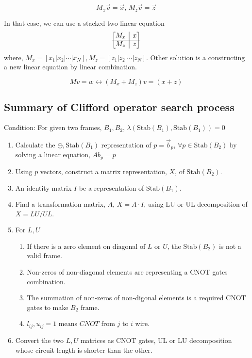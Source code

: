 \documentclass[a4paper,12pt]{article}
\newcommand{\rvline}{\hspace*{-\arraycolsep}\vline\hspace*{-\arraycolsep}}
\begin{document}
\begin{equation}
    M_x \vec{v} = \vec{x}, \, M_z \vec{v} = \vec{z}
\end{equation}

In that case, we can use a stacked two linear equation 
\begin{equation}
    \begin{bmatrix}
        M_x & \rvline & x\\
        \hline
        M_z & \rvline & z\\
    \end{bmatrix}
\end{equation}
where, $M_x = [x_1| x_2 | \cdots | x_N], M_z = [z_1| z_2 | \cdots | z_N]$.
Other solution is a constructing a new linear equation by linear combination.

\begin{equation}
    M v = w \leftrightarrow  (M_x + M_z) v = (x + z) 
\end{equation}

\subsection{Summary of Clifford operator search process}

Condition: For given two frames, $B_1, B_2$, $\lambda(\mbox{Stab}(B_1), \mbox{Stab}(B_1)) = 0$

\begin{enumerate}
    \item Calculate the $\oplus, \mbox{Stab}(B_1)$ representation of $p = \vec{b}_p$, $\forall p \in \mbox{Stab}(B_2)$ by solving a linear equation, $Ab_p = p$
    \item Using $p$ vectors, construct a matrix representation, $X$, of $\mbox{Stab}(B_2)$.
    \item An identity matrix $I$ be a representation of $\mbox{Stab}(B_1)$.
    \item Find a transformation matrix, $A, \, X = A \cdot I$, using LU or UL decomposition of $X = LU/ UL$.
    \item For $L, U$
        \begin{enumerate}
            \item If there is a zero element on diagonal of $L$ or $U$, the $\mbox{Stab}(B_2)$ is not a valid frame.
            \item Non-zeros of non-diagonal elements are representing a CNOT gates combination.
            \item The summation of non-zeros of non-digonal elements is a required CNOT gates to make $B_2$ frame.
            \item $l_{ij}, u_{ij} = 1$ means $CNOT$ from $j$ to $i$ wire.
        \end{enumerate}
    \item Convert the two $L, U$ matrices as CNOT gates, UL or LU decomposition whose circuit length is shorter than the other.
\end{enumerate}
\end{document}
